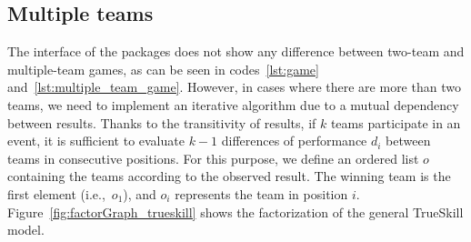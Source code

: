 \documentclass[article]{jss}
\begin{document}
\subsection{Multiple teams} \label{sec:iterative_posterior} 

The interface of the packages does not show any difference between two-team and multiple-team games, as can be seen in codes~\ref{lst:game} and~\ref{lst:multiple_team_game}. 
However, in cases where there are more than two teams, we need to implement an iterative algorithm due to a mutual dependency between results. 
Thanks to the transitivity of results, if $k$ teams participate in an event, it is sufficient to evaluate $k-1$ differences of performance $d_i$ between teams in consecutive positions. 
For this purpose, we define an ordered list $o$ containing the teams according to the observed result. 
The winning team is the first element (i.e.,~$o_1$), and $o_i$ represents the team in position $i$. 
Figure~\ref{fig:factorGraph_trueskill} shows the factorization of the general TrueSkill model. 
%
\end{document}
